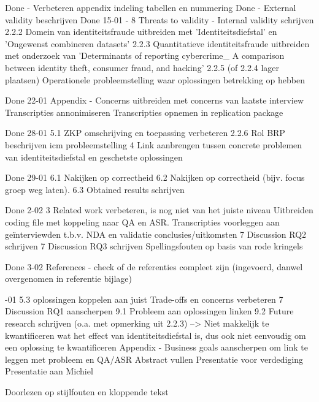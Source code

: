 Done - Verbeteren appendix indeling tabellen en nummering
Done - External validity beschrijven
Done 15-01 - 
8 Threats to validity - Internal validity schrijven
2.2.2 Domein van identiteitsfraude uitbreiden met 'Identiteitsdiefstal' en 'Ongewenst combineren datasets'
2.2.3 Quantitatieve identiteitsfraude uitbreiden met onderzoek van 'Determinants of reporting cybercrime_ A
comparison between identity theft, consumer fraud, and hacking'
2.2.5 (of 2.2.4 lager plaatsen) Operationele probleemstelling waar oplossingen betrekking op hebben

Done 22-01
Appendix - Concerns uitbreiden met concerns van laatste interview
Transcripties annonimiseren
Transcripties opnemen in replication package

Done 28-01
5.1 ZKP omschrijving en toepassing verbeteren
2.2.6 Rol BRP beschrijven icm probleemstelling
4 Link aanbrengen tussen concrete problemen van identiteitsdiefstal en geschetste oplossingen

Done 29-01
6.1 Nakijken op correctheid
6.2 Nakijken op correctheid (bijv. focus groep weg laten).
6.3 Obtained results schrijven

Done 2-02
3 Related work verbeteren, is nog niet van het juiste niveau
Uitbreiden coding file met koppeling naar QA en ASR.
Transcripties voorleggen aan geïnterviewden t.b.v. NDA en validatie conclusies/uitkomsten
7 Discussion RQ2 schrijven
7 Discussion RQ3 schrijven
Spellingsfouten op basis van rode kringels

Done 3-02
References - check of de referenties compleet zijn (ingevoerd, danwel overgenomen in referentie bijlage)


-01
5.3 oplossingen koppelen aan juist Trade-offs en concerns verbeteren
7 Discussion RQ1 aanscherpen
9.1 Probleem aan oplossingen linken
9.2 Future research schrijven (o.a. met opmerking uit 2.2.3)
--> Niet makkelijk te kwantificeren wat het effect van identiteitsdiefstal is, dus ook niet eenvoudig om een oplossing te kwantificeren
Appendix - Business goals aanscherpen om link te leggen met probleem en QA/ASR
Abstract vullen
Presentatie voor verdediging
Presentatie aan Michiel

\todo
Doorlezen op stijlfouten en kloppende tekst
